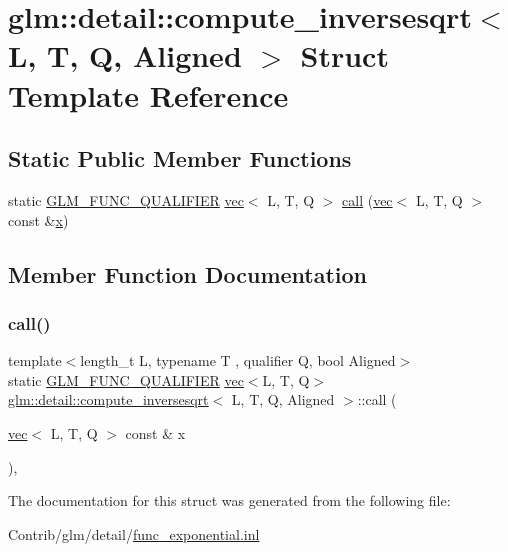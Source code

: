 \hypertarget{structglm_1_1detail_1_1compute__inversesqrt}{}\section{glm\+:\+:detail\+:\+:compute\+\_\+inversesqrt$<$ L, T, Q, Aligned $>$ Struct Template Reference}
\label{structglm_1_1detail_1_1compute__inversesqrt}
\subsection*{Static Public Member Functions}
\begin{DoxyCompactItemize}
\item 
static \mbox{\hyperlink{setup_8hpp_a33fdea6f91c5f834105f7415e2a64407}{G\+L\+M\+\_\+\+F\+U\+N\+C\+\_\+\+Q\+U\+A\+L\+I\+F\+I\+ER}} \mbox{\hyperlink{structglm_1_1vec}{vec}}$<$ L, T, Q $>$ \mbox{\hyperlink{structglm_1_1detail_1_1compute__inversesqrt_a561ccd247f02dcc4b10254e7f841333c}{call}} (\mbox{\hyperlink{structglm_1_1vec}{vec}}$<$ L, T, Q $>$ const \&\mbox{\hyperlink{_s_d_l__opengl_8h_ad0e63d0edcdbd3d79554076bf309fd47}{x}})
\end{DoxyCompactItemize}


\subsection{Member Function Documentation}
\mbox{\label{structglm_1_1detail_1_1compute__inversesqrt_a561ccd247f02dcc4b10254e7f841333c}} 
\subsubsection{\texorpdfstring{call()}{call()}}
{\footnotesize\ttfamily template$<$length\+\_\+t L, typename T , qualifier Q, bool Aligned$>$ \\
static \mbox{\hyperlink{setup_8hpp_a33fdea6f91c5f834105f7415e2a64407}{G\+L\+M\+\_\+\+F\+U\+N\+C\+\_\+\+Q\+U\+A\+L\+I\+F\+I\+ER}} \mbox{\hyperlink{structglm_1_1vec}{vec}}$<$L, T, Q$>$ \mbox{\hyperlink{structglm_1_1detail_1_1compute__inversesqrt}{glm\+::detail\+::compute\+\_\+inversesqrt}}$<$ L, T, Q, Aligned $>$\+::call (\begin{DoxyParamCaption}\item[{\mbox{\hyperlink{structglm_1_1vec}{vec}}$<$ L, T, Q $>$ const \&}]{x }\end{DoxyParamCaption})\hspace{0.3cm}{\ttfamily [inline]}, {\ttfamily [static]}}



The documentation for this struct was generated from the following file\+:\begin{DoxyCompactItemize}
\item 
Contrib/glm/detail/\mbox{\hyperlink{func__exponential_8inl}{func\+\_\+exponential.\+inl}}\end{DoxyCompactItemize}
